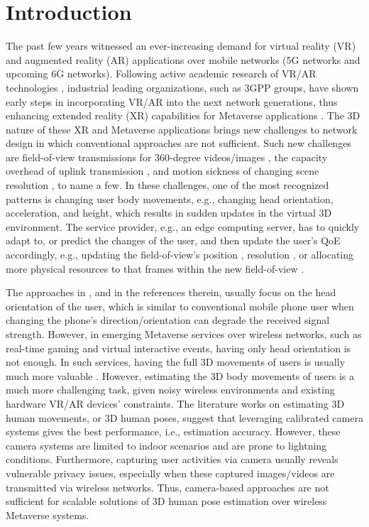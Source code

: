 \documentclass[conference, 10pt]{IEEEtran}
\begin{document}
\section{Introduction}
The past few years witnessed an ever-increasing demand for virtual reality (VR) and augmented reality (AR) applications over mobile networks (5G networks and upcoming 6G networks). Following active academic research of VR/AR technologies \cite{siriwardhana2021survey}, industrial leading organizations, such as 3GPP groups, have shown early steps in incorporating VR/AR into the next network generations, thus enhancing extended reality (XR) capabilities for Metaverse applications \cite{5gamericas2024}. The 3D nature of these XR and Metaverse applications brings new challenges to network design in which conventional approaches are not sufficient. Such new challenges are field-of-view transmissions for 360-degree videos/images \cite{guo2023federated}, the capacity overhead of uplink transmission \cite{jiang2023qoe}, and motion sickness of changing scene resolution \cite{fernandes2016combating}, to name a few. In these challenges, one of the most recognized patterns is changing user body movements, e.g., changing head orientation, acceleration, and height, which results in sudden updates in the virtual 3D environment. The service provider, e.g., an edge computing server, has to quickly adapt to, or predict the changes of the user, and then update the user's QoE accordingly, e.g., updating the field-of-view's position \cite{guo2023federated}, resolution \cite{fernandes2016combating}, or allocating more physical resources to that frames within the new field-of-view \cite{5gamericas2024}. 

The approaches in \cite{5gamericas2024, fernandes2016combating, jiang2023qoe, guo2023federated}, and in the references therein, usually focus on the head orientation of the user, which is similar to conventional mobile phone user when changing the phone's direction/orientation can degrade the received signal strength. However, in emerging Metaverse services over wireless networks, such as real-time gaming and virtual interactive events, having only head orientation is not enough. In such services, having the full 3D movements of users is usually much more valuable \cite{siriwardhana2021survey}. However, estimating the 3D body movements of users is a much more challenging task, given noisy wireless environments and existing hardware VR/AR devices' constraints. The literature works on estimating 3D human movements, or 3D human poses, suggest that leveraging calibrated camera systems gives the best performance, i.e., estimation accuracy. However, these camera systems are limited to indoor scenarios and are prone to lightning conditions. Furthermore, capturing user activities via camera usually reveals vulnerable privacy issues, especially when these captured images/videos are transmitted via wireless networks. Thus, camera-based approaches are not sufficient for scalable solutions of 3D human pose estimation over wireless Metaverse systems. 
\end{document}
